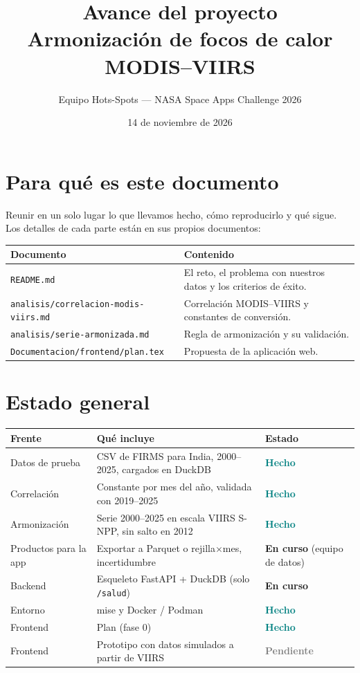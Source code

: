 \documentclass[11pt,a4paper]{article}
\title{Avance del proyecto\\[0.3em]
  \large Armonización de focos de calor MODIS--VIIRS}
\author{Equipo Hots-Spots --- NASA Space Apps Challenge 2026}
\date{14 de noviembre de 2026}
\newcommand{\hecho}{\textcolor{teal}{\textbf{Hecho}}}
\newcommand{\encurso}{\textcolor{orange!80!black}{\textbf{En curso}}}
\newcommand{\pendiente}{\textcolor{gray}{\textbf{Pendiente}}}
\begin{document}
\maketitle

\section{Para qué es este documento}

Reunir en un solo lugar lo que llevamos hecho, cómo reproducirlo y qué sigue. Los
detalles de cada parte están en sus propios documentos:

\begin{tabularx}{\linewidth}{@{}lX@{}}
\toprule
Documento & Contenido \\
\midrule
\texttt{README.md} & El reto, el problema con nuestros datos y los criterios de éxito. \\
\texttt{analisis/correlacion-modis-viirs.md} & Correlación MODIS--VIIRS y constantes de conversión. \\
\texttt{analisis/serie-armonizada.md} & Regla de armonización y su validación. \\
\texttt{Documentacion/frontend/plan.tex} & Propuesta de la aplicación web. \\
\bottomrule
\end{tabularx}

\section{Estado general}

\begin{tabularx}{\linewidth}{@{}lXl@{}}
\toprule
Frente & Qué incluye & Estado \\
\midrule
Datos de prueba & CSV de FIRMS para India, 2000--2025, cargados en DuckDB & \hecho \\
Correlación & Constante por mes del año, validada con 2019--2025 & \hecho \\
Armonización & Serie 2000--2025 en escala VIIRS S-NPP, sin salto en 2012 & \hecho \\
Productos para la app & Exportar a Parquet o rejilla$\times$mes, incertidumbre & \encurso{} (equipo de datos) \\
Backend & Esqueleto FastAPI + DuckDB (solo \texttt{/salud}) & \encurso \\
Entorno & mise y Docker / Podman & \hecho \\
Frontend & Plan (fase 0) & \hecho \\
Frontend & Prototipo con datos simulados a partir de VIIRS & \pendiente \\
\bottomrule
\end{tabularx}
\end{document}
